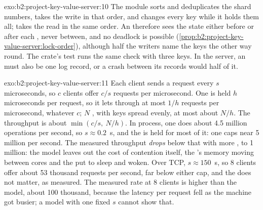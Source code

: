 \begin{solution}{exo:b2:project-key-value-server:10}
The module  sorts and deduplicates the shard numbers, takes the write  in that order, and changes
every key while it holds them all;  takes the read  in the same order. An  therefore sees the
state either before or after each , never between, and no deadlock is possible
(\cref{prop:b2:project-key-value-server:lock-order}), although half the writers name the keys the other way round. The
crate's test runs the same check with three keys. In the server, an  must also be one log record, or a crash
between its records would  half of it.
\end{solution}

\begin{solution}{exo:b2:project-key-value-server:11}
Each client sends a request every $s$ microseconds, so $c$ clients offer $c / s$ requests per microsecond. One  is
held $h$ microseconds per request, so it lets through at most $1 / h$ requests per microsecond, whatever $c$; $N$ ,
with keys spread evenly, at most about $N / h$. The throughput is about $\min(c / s,\ N / h)$. In process, one  does
about 4.5 million operations per second, so $s \approx 0.2$~\textmu s, and the  is held for most of it: one  caps
near 5 million per second. The measured throughput \emph{drops} below that with more , to 1 million: the model
leaves out the cost of contention itself, the 's memory moving between cores and the  put to sleep and woken.
Over TCP, $s \approx 150$~\textmu s, so 8 clients offer about 53 thousand requests per second, far below either cap,
and the  does not matter, as measured. The measured rate at 8 clients is higher than the model, about 100 thousand,
because the latency per request fell as the machine got busier; a model with one fixed $s$ cannot show that.
\end{solution}

